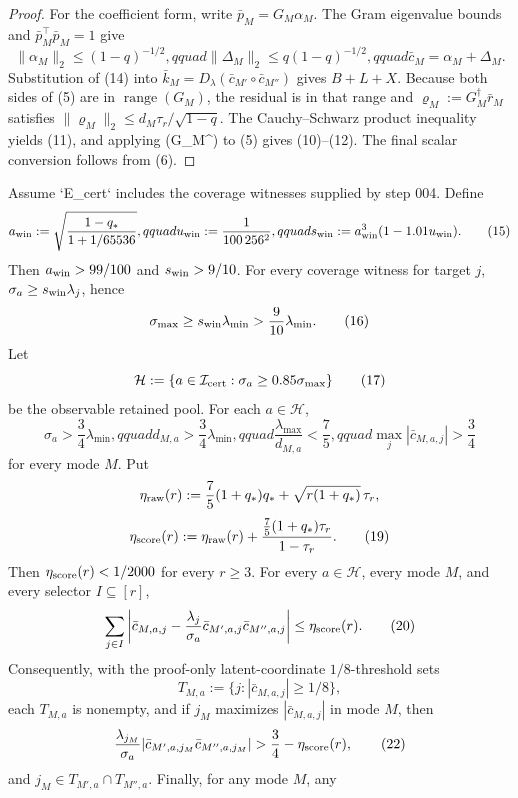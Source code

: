\begin{proposition}
\begin{proof}
For the coefficient form, write $\bar p_M=G_M\alpha_M$.  The Gram
eigenvalue bounds and $\bar p_M^\top\bar p_M=1$ give
\[
\|\alpha_M\|_2\le(1-q)^{-1/2},qquad
\|\Delta_M\|_2\le q(1-q)^{-1/2},qquad
\bar c_M=\alpha_M+\Delta_M.
\tag{14}
\]
Substitution of (14) into
$\bar k_M=D_\lambda(\bar c_{M'}\circ\bar c_{M''})$ gives $B+L+X$.
Because both sides of (5) are in $\operatorname{range}(G_M)$, the residual
is in that range and $\varrho_M:=G_M^\dagger\bar r_M$ satisfies
$\|\varrho_M\|_2\le d_M\tau_r/\sqrt{1-q}$.  The Cauchy--Schwarz
product inequality yields (11), and applying (G\_M\textasciicircum{}\dagger) to (5) gives
(10)--(12).  The final scalar conversion follows from (6). 


\end{proof}
\end{proposition}
\begin{proposition}\label{prop:step-005-threshold-ledger}
Assume `E\_cert` includes the
coverage witnesses supplied by step 004.  Define
\[
a_{\rm win}:=\sqrt{\frac{1-q_*}{1+1/65536}},qquad
u_{\rm win}:=\frac1{100\,256^2},qquad
s_{\rm win}:=a_{\rm win}^3(1-1.01u_{\rm win}).
\tag{15}
\]
Then $a_{\rm win}>99/100$ and $s_{\rm win}>9/10$.  For every coverage
witness for target $j$, $\sigma_a\ge s_{\rm win}\lambda_j$, hence
\[
\sigma_{\max}\ge s_{\rm win}\lambda_{\min}>\frac9{10}\lambda_{\min}.
\tag{16}
\]
Let
\[
\mathcal H:=\{a\in\mathcal I_{\rm cert}:\sigma_a\ge0.85\sigma_{\max}\}
\tag{17}
\]
be the observable retained pool.  For each $a\in\mathcal H$,
\[
\sigma_a>\frac34\lambda_{\min},qquad
d_{M,a}>\frac34\lambda_{\min},qquad
\frac{\lambda_{\max}}{d_{M,a}}<\frac75,qquad
\max_j|\bar c_{M,a,j}|>\frac34
\tag{18}
\]
for every mode $M$.  Put
\[
\eta_{\rm raw}(r):=\frac75(1+q_*)q_*+
\sqrt{r(1+q_*)}\,\tau_r,
\]
\[
\eta_{\rm score}(r):=\eta_{\rm raw}(r)+
\frac{\frac75(1+q_*)\tau_r}{1-\tau_r}.
\tag{19}
\]
Then $\eta_{\rm score}(r)<1/2000$ for every $r\ge3$.  For every
$a\in\mathcal H$, every mode $M$, and every selector $I\subseteq[r]$,
\[
\sum_{j\in I}\left|
\bar c_{M,a,j}-\frac{\lambda_j}{\sigma_a}
\bar c_{M',a,j}\bar c_{M'',a,j}
\right|\le\eta_{\rm score}(r).
\tag{20}
\]
Consequently, with the proof-only latent-coordinate $1/8$-threshold sets
\[
T_{M,a}:=\{j:|\bar c_{M,a,j}|\ge1/8\},
\tag{21}
\]
each $T_{M,a}$ is nonempty, and if $j_M$ maximizes
$|\bar c_{M,a,j}|$ in mode $M$, then
\[
\frac{\lambda_{j_M}}{\sigma_a}
|\bar c_{M',a,j_M}\bar c_{M'',a,j_M}|
>\frac34-\eta_{\rm score}(r),
\tag{22}
\]
and $j_M\in T_{M',a}\cap T_{M'',a}$.  Finally, for any mode $M$, any

\end{proposition}
